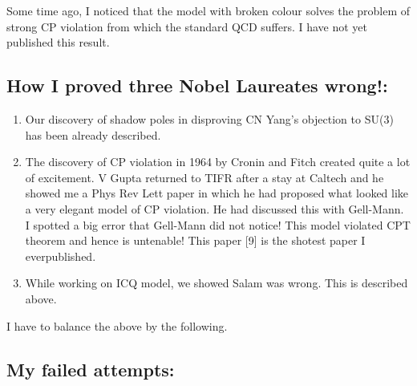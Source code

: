 Some time ago, I noticed that the model with broken colour solves the 
problem of strong CP violation from which the standard QCD suffers. I 
have not yet published this result.

\subsection*{How I proved three Nobel Laureates wrong!:}

\begin{enumerate}
\itemsep=0pt
\item Our discovery of shadow poles in disproving CN Yang's objec\-tion to 
SU(3) has been already described.
\item The discovery of CP violation in 1964 by Cronin and Fitch created 
quite a lot of excitement. V Gupta returned to TIFR after a stay at 
Caltech and he showed me a Phys Rev Lett paper in which he had proposed 
what looked like a very elega\-nt model of CP violation. He had discussed 
this with Gell-Mann. I spotted a big error that Gell-Mann did not 
notice! This model violated CPT theorem and hence is untenab\-le! This 
paper [9] is the shotest paper I ever\break published.
\item While working on ICQ model, we showed Salam was wrong. This is 
described above.
\end{enumerate}

I have to balance the above by the following.

\subsection*{My failed attempts:}

